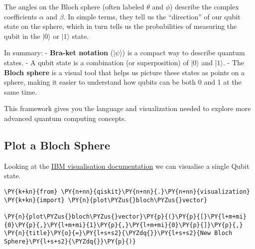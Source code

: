 The angles on the Bloch sphere (often labeled \(\theta\) and \(\phi\))
describe the complex coefficients \(\alpha\) and \(\beta\). In simple
terms, they tell us the ``direction'' of our qubit state on the sphere,
which in turn tells us the probabilities of measuring the qubit in the
\(|0\rangle\) or \(|1\rangle\) state.

In summary: - \textbf{Bra-ket notation} (\(|\psi\rangle\)) is a compact
way to describe quantum states. - A qubit state is a combination (or
superposition) of \(|0\rangle\) and \(|1\rangle\). - The \textbf{Bloch
sphere} is a visual tool that helps us picture these states as points on
a sphere, making it easier to understand how qubits can be both 0 and 1
at the same time.

This framework gives you the language and visualization needed to
explore more advanced quantum computing concepts.

    \hypertarget{plot-a-bloch-sphere}{%
\subsection*{Plot a Bloch Sphere}\label{plot-a-bloch-sphere}}

Looking at the
\href{https://www.ibm.com/account/reg/us-en/signup?formid=urx-19776}{IBM
visualisation documentation} we can visualise a single Qubit state.

    \begin{tcolorbox}[breakable, size=fbox, boxrule=1pt, pad at break*=1mm,colback=cellbackground, colframe=cellborder]
\begin{Verbatim}[commandchars=\\\{\}]
\PY{k+kn}{from} \PY{n+nn}{qiskit}\PY{n+nn}{.}\PY{n+nn}{visualization} \PY{k+kn}{import} \PY{n}{plot\PYZus{}bloch\PYZus{}vector}

\PY{n}{plot\PYZus{}bloch\PYZus{}vector}\PY{p}{(}\PY{p}{[}\PY{l+m+mi}{0}\PY{p}{,}\PY{l+m+mi}{1}\PY{p}{,}\PY{l+m+mi}{0}\PY{p}{]}\PY{p}{,} \PY{n}{title}\PY{o}{=}\PY{l+s+s2}{\PYZdq{}}\PY{l+s+s2}{New Bloch Sphere}\PY{l+s+s2}{\PYZdq{}}\PY{p}{)}
\end{Verbatim}
\end{tcolorbox}
 
            
    
    \begin{center}
    \end{center}
    { \hspace*{\fill} \\}
    

